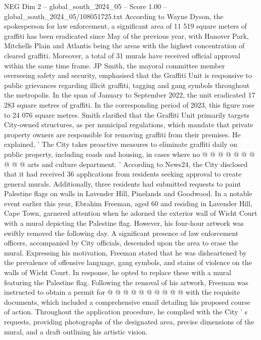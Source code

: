 \begin{textsample}{NEG Dim 2 – global\_south\_2024\_05 – Score 1.00 – global\_south\_2024\_05/108051725.txt}  \label{ex:f2_neg_218}
According to Wayne Dyson, the spokesperson for law enforcement, a significant area of 11 519 square meters of graffiti has been eradicated since May of the previous year, with Hanover Park, Mitchells Plain and Atlantis being the areas with the highest concentration of cleared graffiti.
Moreover, a total of 31 murals have received official approval within the same time frame.
JP Smith, the mayoral committee member overseeing safety and security, emphasised that the Graffiti Unit is responsive to public grievances regarding illicit graffiti, tagging and gang symbols throughout the metropolis.
In the span of January to September 2022, the unit eradicated 17 283 square metres of graffiti.
In the corresponding period of 2023, this figure rose to 24 076 square metres.
Smith clarified that the Graffiti Unit primarily targets City-owned structures, as per municipal regulations, which mandate that private property owners are responsible for removing graffiti from their premises.
He explained, ' The City takes proactive measures to eliminate graffiti daily on public property, including roads and housing, in cases where no @ @ @ @ @ @ @ @ @ @ arts and culture department. ' According to News24, the City disclosed that it had received 36 applications from residents seeking approval to create general murals.
Additionally, three residents had submitted requests to paint Palestine flags on walls in Lavender Hill, Pinelands and Goodwood.
In a notable event earlier this year, Ebrahim Freeman, aged 60 and residing in Lavender Hill, Cape Town, garnered attention when he adorned the exterior wall of Wicht Court with a mural depicting the Palestine flag.
However, his four-hour artwork was swiftly removed the following day.
A significant presence of law enforcement officers, accompanied by City officials, descended upon the area to erase the mural.
Expressing his motivation, Freeman stated that he was disheartened by the prevalence of offensive language, gang symbols, and stains of violence on the walls of Wicht Court.
In response, he opted to replace these with a mural featuring the Palestine flag.
Following the removal of his artwork, Freeman was instructed to obtain a permit for @ @ @ @ @ @ @ @ @ @ with the requisite documents, which included a comprehensive email detailing his proposed course of action.
Throughout the application procedure, he complied with the City ' s requests, providing photographs of the designated area, precise dimensions of the mural, and a draft outlining his artistic vision.

\end{textsample}
